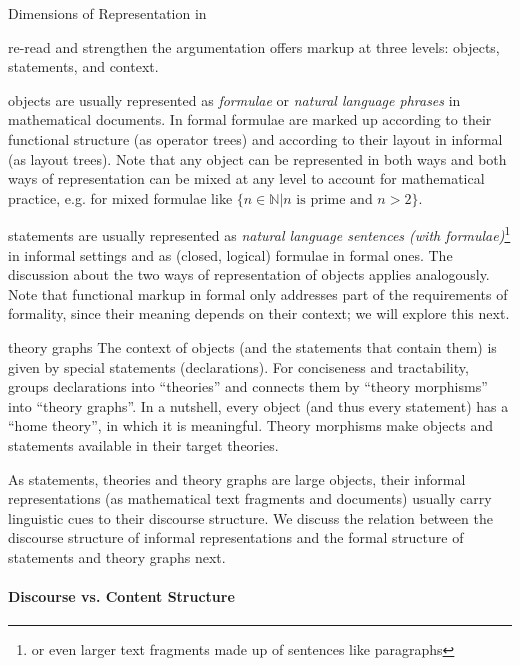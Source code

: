 \begin{omgroup}[id=syntax-semantics]{Dimensions of Representation in \omdoc}
\begin{newpart}{re-read and strengthen the argumentation}
\omdoc offers markup at three levels: objects, statements, and context.
\begin{compactdesc}
\item[objects] are usually represented as {\emph{formulae}} or \emph{natural language
    phrases} in mathematical documents. In formal \omdoc formulae are marked up according
  to their functional structure (as operator trees) and according to their layout in
  informal \omdoc (as layout trees). Note that any object can be represented in both ways
  and both ways of representation can be mixed at any level to account for mathematical
  practice, e.g. for mixed formulae like $\{n\in\mathbb{N}\bigl|\text{$n$ is prime and
    $n>2$}\}$.
\item[statements] are usually represented as \emph{natural language sentences (with
    formulae)}\footnote{or even larger text fragments made up of sentences like
    paragraphs} in informal settings and as (closed, logical) formulae in formal ones. The
  discussion about the two ways of representation of objects applies analogously. Note
  that functional markup in formal \omdoc only addresses part of the requirements of
  formality, since their meaning depends on their context; we will explore this next.
\item[theory graphs] The context of objects (and the statements that contain them) is
  given by special statements (declarations). For conciseness and tractability, \omdoc
  groups declarations into ``theories'' and connects them by ``theory morphisms'' into
  ``theory graphs''. In a nutshell, every object (and thus every statement) has a ``home
  theory'', in which it is meaningful. Theory morphisms make objects and statements
  available in their target theories.
\end{compactdesc}
As statements, theories and theory graphs are large objects, their informal
representations (as mathematical text fragments and documents) usually carry linguistic
cues to their discourse structure. We discuss
the relation between the discourse structure of informal representations and the formal
structure of statements and theory graphs next.

\paragraph{Discourse vs. Content Structure}


\end{newpart}
\end{omgroup}
